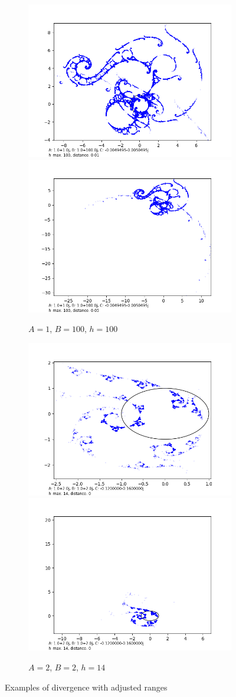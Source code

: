 \documentclass[12pt,a4paper,reqno,parskip=full]{amsart}
\numberwithin{equation}{section}
\theoremstyle{plain}
\theoremstyle{definition}
\begin{document}
\begin{figure}[H]
     \centering
     
     \begin{subfigure}[b]{\textwidth}
         \centering
         \includegraphics[width=.4\textwidth]{images/a1,b100,h100,d.01 custom xy.png}         \includegraphics[width=.4\textwidth]{images/a1,b100,h100,d.05.png}
         \caption{$A=1$, $B=100$, $h=100$}
         \label{fig:a1b100range}
     \end{subfigure}
     \begin{subfigure}[b]{\textwidth}
         \centering
        \includegraphics[width=.4\textwidth]{images/a2b2/a2,b2,h14,d0 custom bounds.png}
        \includegraphics[width=.4\textwidth]{images/a2b2/a2,b2,h14,d0.png}
         \caption{$A=2$, $B=2$, $h=14$}
         \label{fig:a2b2h14range}
     \end{subfigure}
        \caption{Examples of divergence with adjusted ranges}
        \label{fig:divergence-with-ranges}
\end{figure}
\end{document}
